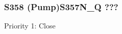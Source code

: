 %
%
%



\subsubsection{S358 (Pump)S357N\_Q ???}

\begin{packed_items}
\item Priority 1: Close
\end{packed_items}

